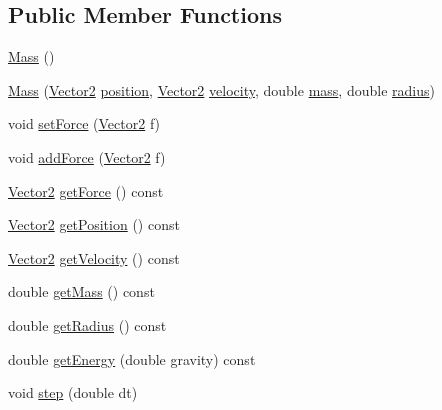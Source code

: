 \subsection*{Public Member Functions}
\begin{DoxyCompactItemize}
\item 
\hyperlink{classMass_aa5d7017a4539bd4b76422cf193a0d23c}{Mass} ()
\item 
\hyperlink{classMass_adc27886a699de8add33229abb90a5469}{Mass} (\hyperlink{classVector2}{Vector2} \hyperlink{classMass_a6a0d58d24ab413d10d0cee1f3fb82bf7}{position}, \hyperlink{classVector2}{Vector2} \hyperlink{classMass_ab3825e4083083ba184e5060303b913a7}{velocity}, double \hyperlink{classMass_a8f37b93ded277000424b7a92adcf9c30}{mass}, double \hyperlink{classMass_afca87b38f7a4a6c4cfadbfba313dc4cf}{radius})
\item 
void \hyperlink{classMass_a0e1280cef830d9d160577fe3d46ac6f5}{set\+Force} (\hyperlink{classVector2}{Vector2} f)
\item 
void \hyperlink{classMass_aa4c034fd024e5ef2c81b4f9b5ff4ca7a}{add\+Force} (\hyperlink{classVector2}{Vector2} f)
\item 
\hyperlink{classVector2}{Vector2} \hyperlink{classMass_a41b3a36c1f242dd8a7018693de3a59bb}{get\+Force} () const
\item 
\hyperlink{classVector2}{Vector2} \hyperlink{classMass_a7b244f213544f309b07970e4883089dc}{get\+Position} () const
\item 
\hyperlink{classVector2}{Vector2} \hyperlink{classMass_adba409e1c341b4709a2545a354b8c91d}{get\+Velocity} () const
\item 
double \hyperlink{classMass_a99e1ec35c6095c90a4b631228f04900f}{get\+Mass} () const
\item 
double \hyperlink{classMass_a9ec88fcb850a603f9f9085cfe09796ee}{get\+Radius} () const
\item 
double \hyperlink{classMass_a5296c919bc09faea8152b8d40c66f92f}{get\+Energy} (double gravity) const
\item 
void \hyperlink{classMass_af603ce820dd8afd520a98d8ac4f00933}{step} (double dt)
\end{DoxyCompactItemize}
